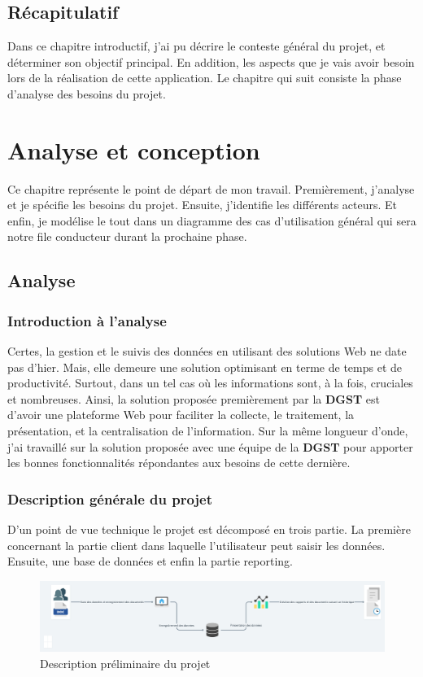 \documentclass[a4paper]{report}
\begin{document}
\begin{doublespace}
	\section{Récapitulatif}
	
	Dans ce chapitre introductif, j'ai pu décrire le conteste général du
	projet, et
	déterminer son objectif principal. En addition, les aspects que je vais
	avoir besoin lors de la réalisation de cette application.
	Le chapitre qui suit consiste la phase d'analyse des besoins du projet.
	\newpage
	\chapter{Analyse et conception}
	\renewcommand{\headrulewidth}{1pt}
	\fancyhead[L]{\hspace*{5cm}}
	
	Ce chapitre représente le point de départ de mon travail. Premièrement,
	j'analyse et
	je spécifie les besoins du projet. Ensuite, j'identifie les différents
	acteurs. Et enfin, je
	modélise le tout dans un diagramme des cas d’utilisation général qui
	sera notre file conducteur
	durant la prochaine phase.
	\section{Analyse}
	\subsection{Introduction à l'analyse}
	Certes, la gestion et le suivis des données en utilisant des solutions
	Web ne date pas d'hier. Mais,
	elle demeure une solution optimisant en terme de temps et de
	productivité. Surtout,
	dans un tel cas où les informations sont, à la fois, cruciales et
	nombreuses. Ainsi, la solution proposée premièrement par la \textbf{DGST} est
	d'avoir une plateforme Web pour faciliter la collecte,
	le traitement, la présentation, et la centralisation de l'information.
	Sur la même longueur d'onde, j'ai
	travaillé sur la solution proposée avec une équipe de la \textbf{DGST}
	pour apporter les bonnes
	fonctionnalités répondantes aux besoins de cette dernière.
	\subsection{Description générale du projet}
	D'un point de vue technique le projet est décomposé en trois partie. La
	première concernant la partie client dans laquelle l'utilisateur peut saisir
	les données. Ensuite, une base de données et enfin la partie reporting.
	\begin{figure}[H]
		\begin{center}
			\includegraphics[scale=0.2]{images/pre-descip-projet.png}
			\caption{Description préliminaire du projet}
		\end{center}
	\end{figure}

\end{doublespace}
\end{document}
